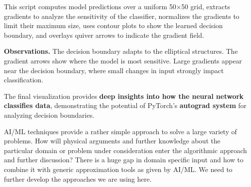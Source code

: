This script computes model predictions over a uniform 50×50 grid, extracts gradients to analyze the sensitivity of the classifier, normalizes the gradients to limit their maximum size, uses contour plots to show the learned decision boundary, and overlays quiver arrows to indicate the gradient field.

\textbf{Observations.} The decision boundary adapts to the elliptical structures. The gradient arrows show where the model is most sensitive. Large gradients appear near the decision boundary, where small changes in input strongly impact classification.

The final visualization provides \textbf{deep insights into how the neural network classifies data}, demonstrating the potential of PyTorch's \textbf{autograd system} for analyzing decision boundaries.

\begin{recommendationbox}
AI/ML techniques provide a rather simple approach to solve a large variety of problems. How will physical arguments and further knowledge about the particular domain or problem under consideration enter the algorithmic approach and further discussion? There is a huge gap in domain specific input and how to combine it with generic approximation tools as given by AI/ML. We need to further develop the approaches we are using here.
\end{recommendationbox}